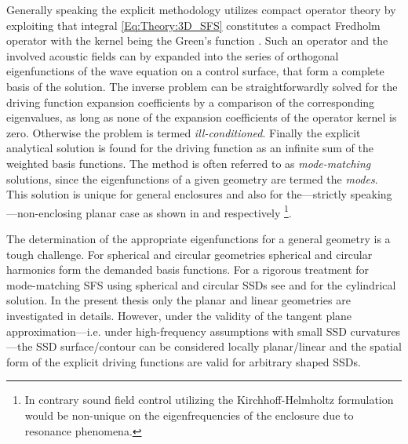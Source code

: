 Generally speaking the explicit methodology utilizes compact operator theory by exploiting that integral \eqref{Eq:Theory:3D_SFS} constitutes a compact Fredholm operator with the kernel being the Green's function \cite{Ahrens2012,MorseFeshbach1953}.
Such an operator and the involved acoustic fields can by expanded into the series of orthogonal eigenfunctions of the wave equation on a control surface, that form a complete basis of the solution.
The inverse problem can be straightforwardly solved for the driving function expansion coefficients by a comparison of the corresponding eigenvalues, as long as none of the expansion coefficients of the operator kernel is zero.
Otherwise the problem is termed \emph{ill-conditioned}.
Finally the explicit analytical solution is found for the driving function as an infinite sum of the weighted basis functions.
The method is often referred to as \emph{mode-matching} solutions, since the eigenfunctions of a given geometry are termed the \emph{modes}.
This solution is unique for general enclosures and also for the---strictly speaking---non-enclosing planar case as shown in \cite{Zotter2013:uniqueness} and \cite{Fazi2010} respectively \footnote{In contrary sound field control utilizing the Kirchhoff-Helmholtz formulation would be non-unique on the eigenfrequencies of the enclosure due to resonance phenomena.}.

The determination of the appropriate eigenfunctions for a general geometry is a tough challenge.
For spherical and circular geometries spherical and circular harmonics form the demanded basis functions. For a rigorous treatment for mode-matching SFS using spherical and circular SSDs see \cite{Ahrens2010phd,Zotter2009phd,Ahrens2012,Ahrens2009:circularSSD_mismatch,Ahrens2009:circular25D_SFR,Ahrens2008:Analytical_Circ_Spherical_SFS,Schultz2014:Comparing_approaches} and \cite{Koyama2014} for the cylindrical solution.
In the present thesis only the planar and linear geometries are investigated in details.
However, under the validity of the tangent plane approximation---i.e. under high-frequency assumptions with small SSD curvatures---the SSD surface/contour can be considered locally planar/linear and the spatial form of the explicit driving functions are valid for arbitrary shaped SSDs.


